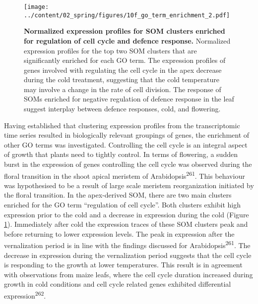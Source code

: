\documentclass[12pt,]{book}
\begin{document}
\begin{figure}[htbp]
\centering
\texttt{[image: ../content/02\_spring/figures/10f\_go\_term\_enrichment\_2.pdf]}
\caption{\textbf{Normalized expression profiles for SOM clusters
enriched for regulation of cell cycle and defence response.} Normalized
expression profiles for the top two SOM clusters that are significantly
enriched for each GO term. The expression profiles of genes involved
with regulating the cell cycle in the apex decrease during the cold
treatment, suggesting that the cold temperature may involve a change in
the rate of cell division. The response of SOMs enriched for negative
regulation of defence response in the leaf suggest interplay between
defence responses, cold, and flowering.}\label{figure:220:go2som}
\end{figure}

Having established that clustering expression profiles from the
transcriptomic time series resulted in biologically relevant groupings
of genes, the enrichment of other GO terms was investigated. Controlling
the cell cycle is an integral aspect of growth that plants need to
tightly control. In terms of flowering, a sudden burst in the expression
of genes controlling the cell cycle was observed during the floral
transition in the shoot apical meristem of
Arabidopsis\textsuperscript{261}. This behaviour was hypothesised to be
a result of large scale meristem reorganization initiated by the floral
transition. In the apex-derived SOM, there are two main clusters
enriched for the GO term ``regulation of cell cycle''. Both clusters
exhibit high expression prior to the cold and a decrease in expression
during the cold (Figure \ref{figure:220:go2som}). Immediately after cold
the expression traces of these SOM clusters peak and before returning to
lower expression levels. The peak in expression after the vernalization
period is in line with the findings discussed for
Arabidopsis\textsuperscript{261}. The decrease in expression during the
vernalization period suggests that the cell cycle is responding to the
growth at lower temperatures. This result is in agreement with
observations from maize leafs, where the cell cycle duration increased
during growth in cold conditions and cell cycle related genes exhibited
differential expression\textsuperscript{262}.
\end{document}
